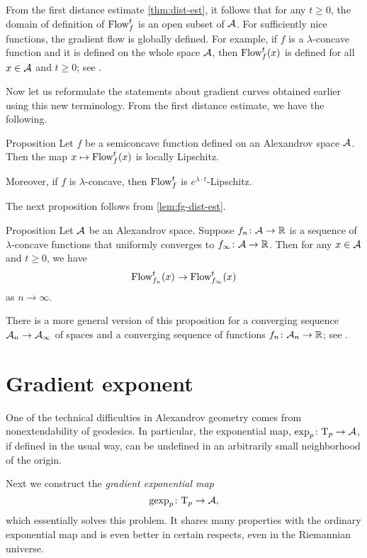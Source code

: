 From the first distance estimate \ref{thm:dist-est}, 
it follows that for any $t\ge 0$, the domain of definition of $\mathop{\rm Flow}\nolimits^t_f$ is an open subset of $\mathcal{A}$.
For sufficiently nice functions, the gradient flow is globally defined.
For example, if $f$ is a $\lambda$-concave function and it is defined on the whole space $\mathcal{A}$, then $\mathop{\rm Flow}\nolimits^t_f(x)$ is defined for all $x\in \mathcal{A}$ and $t\ge0$;
see \cite[16.19]{alexander-kapovitch-petrunin2024}.

Now let us reformulate the statements about gradient curves obtained earlier using this new terminology.
From the first distance estimate, we have the following.

\begin{thm}{Proposition}\label{prop:GF-is-lip}
Let $f$ be a semiconcave function defined on an Alexandrov space $\mathcal{A}$.
Then the map $x\mapsto\mathop{\rm Flow}\nolimits^t_f(x)$ is locally Lipschitz.

Moreover, if $f$ is $\lambda$-concave, then $\mathop{\rm Flow}\nolimits^t_f$ is $e^{\lambda\cdot t}$-Lipschitz.
\end{thm}

The next proposition follows from \ref{lem:fg-dist-est}.

\begin{thm}{Proposition}\label{grad-curve-conv}
Let $\mathcal{A}$ be an Alexandrov space.
Suppose $f_n\colon\mathcal{A}\to\mathbb{R}$ is a sequence of
$\lambda$-concave functions 
that uniformly converges to $f_\infty\colon\mathcal{A}\to \mathbb{R}$. 
Then for any $x\in \mathcal{A}$ and $t\ge 0$, we have
\[\mathop{\rm Flow}\nolimits_{f_n}^t(x)\to \mathop{\rm Flow}\nolimits_{f_\infty}^t(x)\]
as $n\to \infty$.
\end{thm}

There is a more general version of this proposition for a converging sequence $\mathcal{A}_n\to \mathcal{A}_\infty$ of spaces and a converging sequence of functions $f_n\colon\mathcal{A}_n\to\mathbb{R}$; see \cite[16.21]{alexander-kapovitch-petrunin2024}.

\section{Gradient exponent}\label{gexp}

One of the technical difficulties in Alexandrov geometry comes from
nonextendability of geodesics. 
In particular, the exponential map, $\exp_p\colon\mathrm{T}_p\to \mathcal{A}$, if defined in the usual way, can
be undefined in an arbitrarily small neighborhood of the origin. 

Next we construct the \emph{gradient exponential map} 
\[\operatorname{\rm gexp}\nolimits_p\colon\mathrm{T}_p\to\mathcal{A},\]
which essentially solves this problem. 
It shares many properties with the ordinary exponential map and is even better in certain respects,
even in the Riemannian universe.

